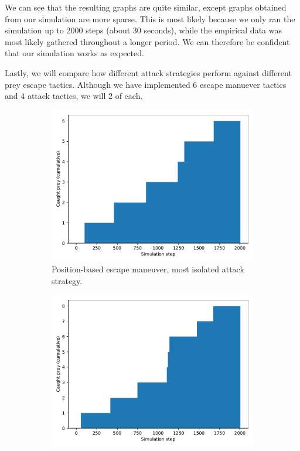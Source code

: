 \documentclass[9pt]{pnas-new}
\begin{document}
We can see that the resulting graphs are quite similar, except graphs obtained from our simulation are more sparse.
This is most likely because we only ran the simulation up to 2000 steps (about 30 seconds), while the empirical data was most likely gathered throughout a longer period.
We can therefore be confident that our simulation works as expected.

Lastly, we will compare how different attack strategies perform against different prey escape tactics.
Although we have implemented 6 escape manuever tactics and 4 attack tactics, we will 2 of each.
\begin{figure}[h]
    \centering
    \begin{subfigure}[t]{0.4\linewidth}
        \includegraphics[width=\linewidth]{avoid_position_attack_peripheral/predator_success_cumulative_2003.pdf}
        \caption{Position-based escape maneuver, most isolated attack strategy.}
    \end{subfigure}%
    \hspace{0.02\linewidth} %
    \begin{subfigure}[t]{0.4\linewidth}
        \includegraphics[width=\linewidth]{avoid_position_attack_nearest/predator_success_cumulative_2003.pdf}

\end{subfigure}
\end{figure}
\end{document}
